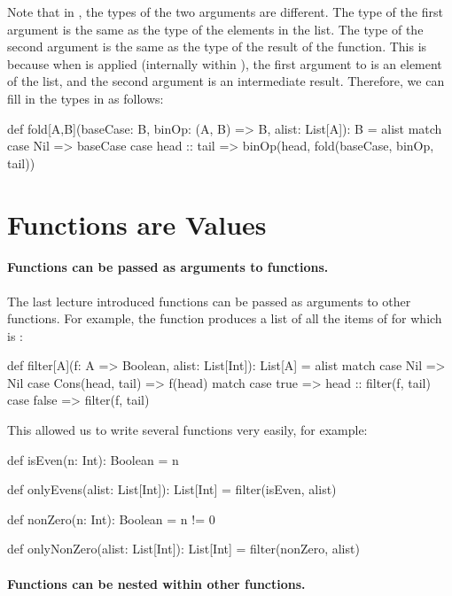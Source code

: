 \documentclass[9pt]{extbook}
\begin{document}
Note that in , the types of the two arguments
are different. The type of the first argument is the same as the
type of the elements in the list. The type of the second argument
is the same as the type of the result of the function. This is because
when  is applied (internally within ),
the first argument to   is an element of the
list, and the second argument is an intermediate result.
Therefore, we can fill in the types in  as follows:
%
\begin{scalacode}
def fold[A,B](baseCase: B, binOp: (A, B) => B, alist: List[A]): B = alist match {
  case Nil => baseCase
  case head :: tail => binOp(head, fold(baseCase, binOp, tail))
}
\end{scalacode}

\section{Functions are Values}

\paragraph{Functions can be passed as arguments to functions.}
The last lecture introduced functions can be passed as arguments
to other functions. For example, the function 
produces a list of all the items of  for which 
is :
%
\begin{scalacode}
def filter[A](f: A => Boolean, alist: List[Int]): List[A] = alist match {
  case Nil => Nil
  case Cons(head, tail) =>
    f(head) match {
      case true => head :: filter(f, tail)
      case false => filter(f, tail)
    }
}
\end{scalacode}

This allowed us to write several functions very easily, for example:
%
\begin{scalacode}
def isEven(n: Int): Boolean = n %

def onlyEvens(alist: List[Int]): List[Int] = {
  filter(isEven, alist)
}

def nonZero(n: Int): Boolean = n != 0

def onlyNonZero(alist: List[Int]): List[Int] = {
  filter(nonZero, alist)
}
\end{scalacode}

\paragraph{Functions can be nested within other functions.}
\end{document}
